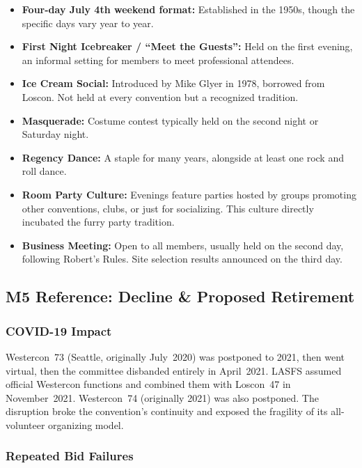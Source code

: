 \documentclass[11pt,letterpaper]{article}
\begin{document}
\begin{itemize}[leftmargin=2em]
  \item \textbf{Four-day July 4th weekend format:} Established in the 1950s, though the specific days vary year to year.
  \item \textbf{First Night Icebreaker / ``Meet the Guests'':} Held on the first evening, an informal setting for members to meet professional attendees.
  \item \textbf{Ice Cream Social:} Introduced by Mike Glyer in 1978, borrowed from Loscon. Not held at every convention but a recognized tradition.
  \item \textbf{Masquerade:} Costume contest typically held on the second night or Saturday night.
  \item \textbf{Regency Dance:} A staple for many years, alongside at least one rock and roll dance.
  \item \textbf{Room Party Culture:} Evenings feature parties hosted by groups promoting other conventions, clubs, or just for socializing. This culture directly incubated the furry party tradition.
  \item \textbf{Business Meeting:} Open to all members, usually held on the second day, following Robert's Rules. Site selection results announced on the third day.
\end{itemize}

\subsection{M5 Reference: Decline \& Proposed Retirement}

\subsubsection{COVID-19 Impact}

Westercon~73 (Seattle, originally July~2020) was postponed to 2021, then went virtual, then the committee disbanded entirely in April~2021. LASFS assumed official Westercon functions and combined them with Loscon~47 in November~2021. Westercon~74 (originally 2021) was also postponed. The disruption broke the convention's continuity and exposed the fragility of its all-volunteer organizing model.

\subsubsection{Repeated Bid Failures}
\end{document}
